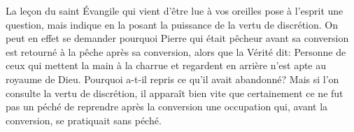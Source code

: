 La leçon du saint Évangile qui vient d’être lue à vos oreilles
		pose à l’esprit une question,
	mais indique en la posant la puissance de la vertu de discrétion.
On peut en effet se demander pourquoi Pierre
	qui était pêcheur avant sa conversion
	est retourné à la pêche après sa conversion,
	alors que la Vérité dit:
	Personne de ceux qui mettent la main à la charrue et regardent en arrière
		n’est apte au royaume de Dieu.
Pourquoi a-t-il repris ce qu’il avait abandonné?
Mais si l’on consulte la vertu de discrétion,
	il apparaît bien vite que certainement ce ne fut pas un péché
	de reprendre après la conversion une occupation qui, avant la conversion,
	se pratiquait sans péché.
